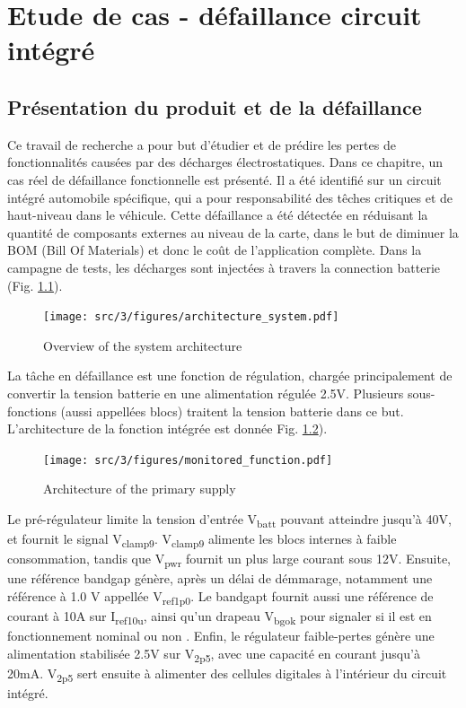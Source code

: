 \chapter{Etude de cas - défaillance circuit intégré}
\label{chap:3}
\section{Présentation du produit et de la défaillance}

Ce travail de recherche a pour but d'étudier et de prédire les pertes de fonctionnalités causées par des décharges électrostatiques.
Dans ce chapitre, un cas réel de défaillance fonctionnelle est présenté.
Il a été identifié sur un circuit intégré automobile spécifique, qui a pour responsabilité des têches critiques et de haut-niveau dans le véhicule.
Cette défaillance a été détectée en réduisant la quantité de composants externes au niveau de la carte, dans le but de diminuer la BOM (Bill Of Materials) et donc le coût de l'application complète.
Dans la campagne de tests, les décharges sont injectées à travers la connection batterie (Fig. \ref{fig:system_architecture}).

\begin{figure}[!h]
  \centering
  \texttt{[image: src/3/figures/architecture\_system.pdf]}
  \caption{Overview of the system architecture}
  \label{fig:system_architecture}
\end{figure}

La tâche en défaillance est une fonction de régulation, chargée principalement de convertir la tension batterie en une alimentation régulée 2.5V.
Plusieurs sous-fonctions (aussi appellées blocs) traitent la tension batterie dans ce but.
L'architecture de la fonction intégrée est donnée Fig. \ref{fig:monitored_function}).

\begin{figure}[!h]
  \centering
  \texttt{[image: src/3/figures/monitored\_function.pdf]}
  \caption{Architecture of the primary supply}
  \label{fig:monitored_function}
\end{figure}

Le pré-régulateur limite la tension d'entrée V\textsubscript{batt} pouvant atteindre jusqu'à 40V, et fournit le signal V\textsubscript{clamp9}.
V\textsubscript{clamp9} alimente les blocs internes à faible consommation, tandis que V\textsubscript{pwr} fournit un plus large courant sous 12V.
Ensuite, une référence bandgap génère, après un délai de démmarage, notamment une référence à 1.0 V appellée V\textsubscript{ref1p0}.
Le bandgapt fournit aussi une référence de courant à 10\textMu{}A sur I\textsubscript{ref10u}, ainsi qu'un drapeau V\textsubscript{bgok} pour signaler si il est en fonctionnement nominal ou non .
Enfin, le régulateur faible-pertes génère une alimentation stabilisée 2.5V sur V\textsubscript{2p5}, avec une capacité en courant jusqu'à 20mA.
V\textsubscript{2p5} sert ensuite à alimenter des cellules digitales à l'intérieur du circuit intégré.

